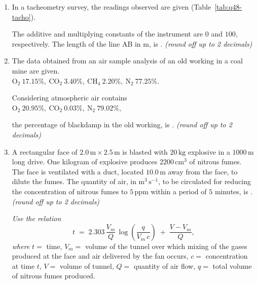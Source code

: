 \documentclass[journal]{IEEEtran}
\begin{document}
\begin{enumerate}[leftmargin=0pt]
\hfill{}
\item In a tacheometry survey, the readings observed are given (Table~\ref{tab:q48-tacho}).


The additive and multiplying constants of the instrument are $0$ and $100$, respectively.
The length of the line AB in m, is \underline{\hspace{1.5cm}}. \textit{(round off up to 2 decimals)}

\hfill{}

\item The data obtained from an air sample analysis of an old working in a coal mine are given.\\[0.25em]
$\mathrm{O_2}\ 17.15\%,\ \mathrm{CO_2}\ 3.40\%,\ \mathrm{CH_4}\ 2.20\%,\ \mathrm{N_2}\ 77.25\%.$

\noindent Considering atmospheric air contains\\[0.25em]
$\mathrm{O_2}\ 20.95\%,\ \mathrm{CO_2}\ 0.03\%,\ \mathrm{N_2}\ 79.02\%,$

\noindent the percentage of blackdamp in the old working, is \underline{\hspace{1.5cm}}. \textit{(round off up to 2 decimals)}

\hfill{}
\item A rectangular face of $2.0\,\mathrm{m}\times2.5\,\mathrm{m}$ is blasted with $20\,\mathrm{kg}$ explosive in a $1000\,\mathrm{m}$ long drive. One kilogram of explosive produces $2200\,\mathrm{cm^3}$ of nitrous fumes. The face is ventilated with a duct, located $10.0\,\mathrm{m}$ away from the face, to dilute the fumes. The quantity of air, in $\mathrm{m^3\,s^{-1}}$, to be circulated for reducing the concentration of nitrous fumes to $5\,\mathrm{ppm}$ within a period of $5$ minutes, is \underline{\hspace{1.5cm}}. \textit{(round off up to 2 decimals)}

\noindent\textit{Use the relation}
\[
t \;=\; 2.303\,\frac{V_m}{Q}\,\log\!\left(\frac{q}{V_m\,c}\right) \;+\; \frac{V - V_m}{Q},
\]
\textit{where } $t=$ time, $V_m=$ volume of the tunnel over which mixing of the gases produced at the face and air delivered by the fan occurs, $c=$ concentration at time $t$, $V=$ volume of tunnel, $Q=$ quantity of air flow, $q=$ total volume of nitrous fumes produced.


\end{enumerate}
\end{document}
